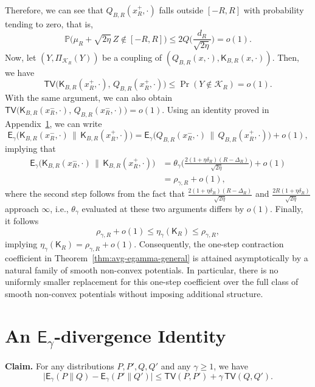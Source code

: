\documentclass[10pt, journal]{IEEEtran}
\newcommand{\sE}{\mathsf{E}}
\newcommand{\sK}{\mathsf{K}}
\newcommand{\TV}{\mathsf{TV}}
\begin{document}
Therefore, we can see that $Q_{B,R}(x^+_R,\cdot)$ falls outside $[-R, R]$ with probability tending to zero, that is, 
$$\mathbb{P}\Big(\mu_R+\sqrt{2\eta}\,Z\notin[-R,R]\Big)\le
2Q\Big(\frac{d_R}{\sqrt{2\eta}}\Big)=o(1).$$
Now, let $(Y, \Pi_{\mathcal K_R}(Y))$ be a coupling of $(Q_{B, R}(x, \cdot), \sK_{B,R}(x, \cdot))$. Then, we have 
$$\TV \bigl(\sK_{B,R}(x_R^+,\cdot),\,Q_{B,R}(x_R^+,\cdot)\bigr)\leq \Pr(Y\notin \mathcal K_R)= o(1).$$
With the same argument, we can also obtain  $\TV \bigl(\sK_{B,R}(x_R^-,\cdot),\,Q_{B,R}(x_R^-,\cdot)\bigr) = o(1).$
Using an identity proved in Appendix~\ref{App:identity}, we can write 
$$\sE_\gamma\!\bigl(\sK_{B,R}(x_R^-,\cdot)\,\|\,\sK_{B,R}(x_R^+,\cdot)\bigr) =\sE_\gamma\!\bigl(Q_{B,R}(x_R^-,\cdot)\,\|\,Q_{B,R}(x_R^+,\cdot)\bigr)+o(1),$$
implying that 
\begin{align*}
    \sE_\gamma\!\bigl(\sK_{B,R}(x_R^-,\cdot)\,\|\,\sK_{B,R}(x_R^+,\cdot)\bigr) & =\theta_\gamma \Big(\frac{2(1+\eta\delta_R)(R-\Delta_R)}{\sqrt{2\eta}}\Big)+o(1)\\
    & = \rho_{\gamma,R}+o(1),
 \end{align*}
 where the second step follows from the fact that $\tfrac{2(1+\eta\delta_R)(R-\Delta_R)}{\sqrt{2\eta}}$ and $\tfrac{2R(1+\eta\delta_R)}{\sqrt{2\eta}}$ approach $\infty$, i.e., $\theta_\gamma$ evaluated at these two arguments differs by $o(1)$. 
Finally, it follows 
$$\rho_{\gamma,R}+o(1) \le\eta_\gamma(\sK_R)\le\rho_{\gamma,R},$$
implying $\eta_\gamma(\sK_R)=\rho_{\gamma,R}+o(1).$ Consequently, the one-step contraction coefficient in Theorem~\ref{thm:avg-egamma-general} is attained asymptotically by a natural family of smooth non-convex potentials. In particular, there is no uniformly smaller replacement for this one-step coefficient over the full class of smooth non-convex potentials without imposing additional structure.


\section{An \texorpdfstring{$\mathsf E_\gamma$}{Egamma}-divergence Identity}\label{App:identity}
\textbf{Claim.} For any distributions $P,P',Q,Q'$ and any $\gamma\ge1$, we have 
$$\bigl|\sE_\gamma(P\|Q)-\sE_\gamma(P'\|Q')\bigr| \le\TV(P,P')+\gamma\,\TV(Q,Q'). $$
\end{document}
